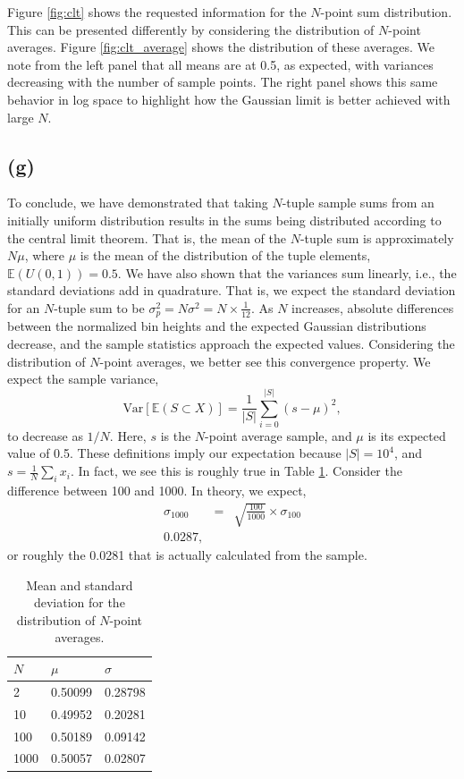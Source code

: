 \documentclass[12pt]{article}
\begin{document}
Figure \ref{fig:clt} shows the requested information for the $N$-point sum distribution.  This can be presented differently by considering the distribution of $N$-point averages. Figure \ref{fig:clt_average} shows the distribution of these averages.  We note from the left panel that all means are at 0.5, as expected, with variances decreasing with the number of sample points.  The right panel shows this same behavior in log space to highlight how the Gaussian limit is better achieved with large $N$.  

\subsection*{(g)}

To conclude, we have demonstrated that taking $N$-tuple sample sums from an initially uniform distribution results in the sums being distributed according to the central limit theorem.  That is, the mean of the $N$-tuple sum is approximately $N \mu$, where $\mu$ is the mean of the distribution of the tuple elements, $\mathbb{E}(U(0,1)) = 0.5$. We have also shown that the variances sum linearly, i.e., the standard deviations add in quadrature.  That is, we expect the standard deviation for an $N$-tuple sum to be $\sigma_p^2 = N \sigma^2 = N\times \frac{1}{12}$.  As $N$ increases, absolute differences between the normalized bin heights and the expected Gaussian distributions decrease, and the sample statistics approach the expected values.  Considering the distribution of $N$-point averages, we better see this convergence property.  We expect the sample variance,
\begin{equation}
\text{Var}[\mathbb{E}(S \subset X)] = \frac{1}{\vert S \vert}\sum_{i=0}^{\vert S \vert} (s - \mu)^2,
\end{equation}
to decrease as $1 / N$.  Here, $s$ is the $N$-point average sample, and $\mu$ is its expected value of 0.5. These definitions imply our expectation because $\vert S \vert = 10^4$, and $s = \frac{1}{N}\sum_i x_i$. In fact, we see this is roughly true in Table \ref{tab:convergence}.  Consider the difference between 100 and 1000.  In theory, we expect,
\begin{eqnarray}
\sigma_{1000} &=& \sqrt{\frac{100}{1000}} \times \sigma_{100}\\
0.0287,
\end{eqnarray}
or roughly the 0.0281 that is actually calculated from the sample.
\begin{table}
\centering
\caption{Mean and standard deviation for the distribution of $N$-point averages.} \label{tab:convergence}
\begin{tabular}{|l|l|l|}
\hline
$N$ & $\mu$ & $\sigma$\\
\hline
2 & 0.50099 & 0.28798\\
10 & 0.49952 & 0.20281\\
100 & 0.50189 & 0.09142\\
1000 & 0.50057& 0.02807\\
\hline
\end{tabular}
\end{table}
\end{document}
